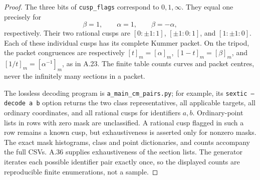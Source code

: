 \begin{proof}
The three bits of \texttt{cusp\_flags} correspond to $0,1,\infty$.
They equal one precisely for
\[
 \beta=1,\qquad \alpha=1,\qquad \beta=-\alpha,
\]
respectively. Their two rational cusps are
$[0:\pm1:1]$, $[\pm1:0:1]$, and $[1:\pm1:0]$.
Each of these individual cusps has its complete Kummer packet. On the
tripod, the packet congruences are respectively
$[t]_m=[\alpha]_m$, $[1-t]_m=[\beta]_m$, and
$[1/t]_m=[\alpha^{-1}]_m$, as in A.23. The finite table counts curves
and packet centres, never the infinitely many sections in a packet.

The lossless decoding program is
\texttt{a\_main\_cm\_pairs.py}; for example, its
\texttt{sextic --decode a b} option returns the two class representatives,
all applicable targets, all ordinary coordinates, and all rational cusps
for identifiers $a,b$. Ordinary-point lists in rows with zero mask are
unclassified. A rational cusp flagged in such a row remains a known
cusp, but exhaustiveness is asserted only for nonzero masks. The exact
mask histograms, class and point dictionaries, and counts accompany
the full CSVs. A.36 supplies exhaustiveness of the section lists. The
generator iterates each possible identifier pair exactly once, so the
displayed counts are reproducible finite enumerations, not a sample.
\end{proof}

